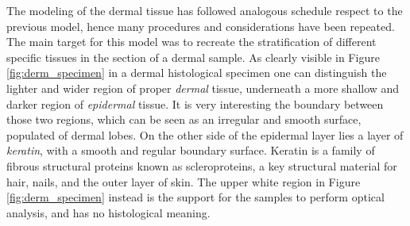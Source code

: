 \documentclass[12pt,a4paper]{report}
\begin{document}
The modeling of the dermal tissue has followed analogous schedule respect to the previous model, hence many procedures and considerations have been repeated. The main target for this model was to recreate the stratification of different specific tissues in the section of a dermal sample. As clearly visible in Figure \ref{fig:derm_specimen} in a dermal histological specimen one can distinguish the lighter and wider region of proper \textit{dermal} tissue, underneath a more shallow and darker region of \textit{epidermal} tissue. It is very interesting the boundary between those two regions, which can be seen as an irregular and smooth surface, populated of dermal lobes. On the other side of the epidermal layer lies a layer of \textit{keratin}, with a smooth and regular boundary surface. Keratin is a family of fibrous structural proteins known as scleroproteins, a key structural material for hair, nails, and the outer layer of skin. The upper white region in Figure \ref{fig:derm_specimen} instead is the support for the samples to perform optical analysis, and has no histological meaning.
\end{document}
